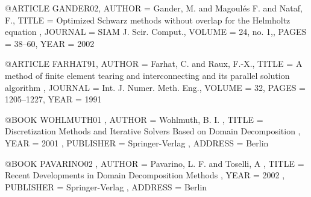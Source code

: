 \documentclass{report}
\begin{document}
@ARTICLE{ GANDER02,
AUTHOR = { Gander, M. and Magoul\'{e}s F. and Nataf, F.},
TITLE = { Optimized {S}chwarz methods without overlap for the
{H}elmholtz equation },
JOURNAL = { SIAM J. Scir. Comput.},
VOLUME = { 24, no. 1,},
PAGES = { 38--60},
YEAR = { 2002 }}

@ARTICLE{ FARHAT91,
AUTHOR = { Farhat, C. and Raux, F.-X.},
TITLE = { A method of finite element tearing and
interconnecting and its parallel solution algorithm },
JOURNAL = { Int. J. Numer. Meth. Eng.},
VOLUME = { 32},
PAGES = { 1205--1227},
YEAR = { 1991 }}


@BOOK{ WOHLMUTH01 ,
AUTHOR = { Wohlmuth, B. I. },
TITLE = { Discretization Methods and Iterative Solvers Based
on Domain Decomposition },
YEAR = { 2001 },
PUBLISHER = { Springer-Verlag },
ADDRESS = { Berlin }}


@BOOK{ PAVARINO02 ,
AUTHOR = { Pavarino, L. F. and Toselli, A },
TITLE = { Recent Developments in Domain Decomposition Methods },
YEAR = { 2002 },
PUBLISHER = { Springer-Verlag },
ADDRESS = { Berlin }}
\end{document}
